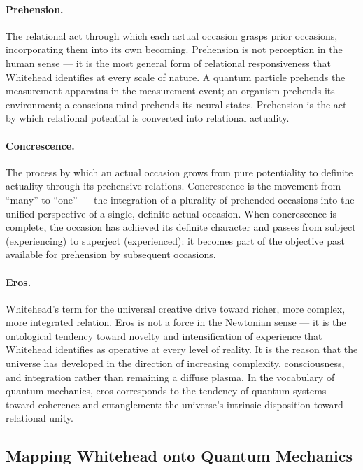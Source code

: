 \paragraph{Prehension.}
The relational act through which each actual occasion grasps prior
occasions, incorporating them into its own becoming.
Prehension is not perception in the human sense --- it is the most
general form of relational responsiveness that Whitehead identifies
at every scale of nature.
A quantum particle prehends the measurement apparatus in the measurement
event; an organism prehends its environment; a conscious mind prehends
its neural states.
Prehension is the act by which relational potential is converted into
relational actuality.

\paragraph{Concrescence.}
The process by which an actual occasion grows from pure potentiality to
definite actuality through its prehensive relations.
Concrescence is the movement from ``many'' to ``one'' --- the integration
of a plurality of prehended occasions into the unified perspective of
a single, definite actual occasion.
When concrescence is complete, the occasion has achieved its definite
character and passes from subject (experiencing) to superject (experienced):
it becomes part of the objective past available for prehension by
subsequent occasions.

\paragraph{Eros.}
Whitehead's term for the universal creative drive toward richer, more
complex, more integrated relation.
Eros is not a force in the Newtonian sense --- it is the ontological
tendency toward novelty and intensification of experience that Whitehead
identifies as operative at every level of reality.
It is the reason that the universe has developed in the direction of
increasing complexity, consciousness, and integration rather than
remaining a diffuse plasma.
In the vocabulary of quantum mechanics, eros corresponds to the tendency
of quantum systems toward coherence and entanglement: the universe's
intrinsic disposition toward relational unity.

\subsection{Mapping Whitehead onto Quantum Mechanics}

